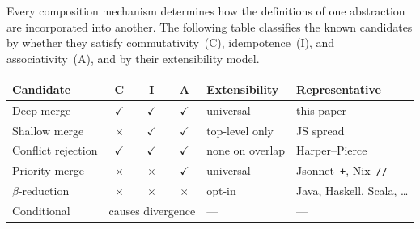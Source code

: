 Every composition mechanism determines how the definitions of one
abstraction are incorporated into another.
The following table classifies the known candidates by whether
they satisfy commutativity~(C), idempotence~(I), and
associativity~(A), and by their extensibility model.

\begin{center}
  \begin{tabular}{lcccll}
    \textbf{Candidate} & \textbf{C} & \textbf{I} & \textbf{A}
    & \textbf{Extensibility} & \textbf{Representative} \\
    \hline
    Deep merge
    & $\checkmark$ & $\checkmark$ & $\checkmark$
    & universal & this paper \\
    Shallow merge
    & $\times$ & $\checkmark$ & $\checkmark$
    & top-level only & JS spread \\
    Conflict rejection
    & $\checkmark$ & $\checkmark$ & $\checkmark$
    & none on overlap
    & Harper--Pierce~\cite{harper1991-symmetric-record-concatenation} \\
    Priority merge
    & $\times$ & $\times$ & $\checkmark$
    & universal & Jsonnet~\texttt{+}, Nix~\texttt{//} \\
    $\beta$-reduction
    & $\times$ & $\times$ & $\times$
    & opt-in & Java, Haskell, Scala, \ldots \\
    Conditional
    & \multicolumn{3}{c}{causes divergence}
    & --- & --- \\
  \end{tabular}
\end{center}

